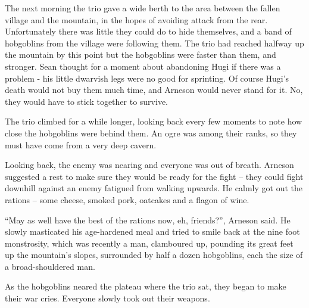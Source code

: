 \begin{exampletext}

The next morning the trio gave a wide berth to the area between the fallen village and the mountain, in the hopes of avoiding attack from the rear.
Unfortunately there was little they could do to hide themselves, and a band of hobgoblins from the village were following them.
The trio had reached halfway up the mountain by this point but the hobgoblins were faster than them, and stronger.
Sean thought for a moment about abandoning Hugi if there was a problem - his little dwarvish legs were no good for sprinting.
Of course Hugi's death would not buy them much time, and Arneson would never stand for it.
No, they would have to stick together to survive.

The trio climbed for a while longer, looking back every few moments to note how close the hobgoblins were behind them. An ogre was among their ranks, so they must have come from a very deep cavern.

Looking back, the enemy was nearing and everyone was out of breath.
Arneson suggested a rest to make sure they would be ready for the fight -- they could fight downhill against an enemy fatigued from walking upwards.
He calmly got out the rations -- some cheese, smoked pork, oatcakes and a flagon of wine.

``May as well have the best of the rations now, eh, friends?'', Arneson said.
He slowly masticated his age-hardened meal and tried to smile back at the nine foot monstrosity, which was recently a man, clamboured up, pounding its great feet up the mountain's slopes, surrounded by half a dozen hobgoblins, each the size of a broad-shouldered man.

As the hobgoblins neared the plateau where the trio sat, they began to make their war cries.
Everyone slowly took out their weapons.


\end{exampletext}


